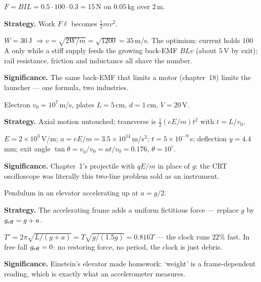 \begin{example}\label{ex:w29}
$F=BIL=0.5\cdot100\cdot0.3=15$\,N on $0.05$\,kg over $2$\,m.
\par\smallskip
\textbf{Strategy.} Work $F\ell$ becomes $\tfrac12mv^{2}$.
\begin{solution}
$W=30$\,J $\Rightarrow v=\sqrt{2W/m}=\sqrt{1200}=35$\,m/s.
The optimism: current holds $100$\,A only while a stiff supply feeds
the growing back-EMF $BLv$ (about $5$\,V by exit); rail resistance,
friction and inductance all shave the number. \checkmark
\end{solution}
\textbf{Significance.} The same back-EMF that limits a motor
(chapter~18) limits the launcher --- one formula, two industries.
\end{example}

\begin{example}\label{ex:w30}
Electron $v_0=10^{7}$\,m/s, plates $L=5$\,cm, $d=1$\,cm, $V=20$\,V.
\par\smallskip
\textbf{Strategy.} Axial motion untouched; transverse is
$\tfrac12(eE/m)t^{2}$ with $t=L/v_0$.
\begin{solution}
$E=2\times10^{3}$\,V/m; $a=eE/m=3.5\times10^{14}$\,m/s$^{2}$;
$t=5\times10^{-9}$\,s; deflection $y=4.4$\,mm;
exit angle $\tan\theta=v_y/v_0=at/v_0=0.176$, $\theta=10^{\circ}$.
\checkmark
\end{solution}
\textbf{Significance.} Chapter~1's projectile with $qE/m$ in place of
$g$: the CRT oscilloscope was literally this two-line problem sold as
an instrument.
\end{example}

\begin{example}\label{ex:w31}
Pendulum in an elevator accelerating up at $a=g/2$.
\par\smallskip
\textbf{Strategy.} The accelerating frame adds a uniform fictitious
force --- replace $g$ by $g_{\rm eff}=g+a$.
\begin{solution}
$T'=2\pi\sqrt{L/(g+a)}=T\sqrt{g/(1.5g)}=0.816T$ --- the clock runs
$22\%$ fast. In free fall $g_{\rm eff}=0$: no restoring force, no
period, the clock is just debris. \checkmark
\end{solution}
\textbf{Significance.} Einstein's elevator made homework: `weight'
is a frame-dependent reading, which is exactly what an accelerometer
measures.
\end{example}

